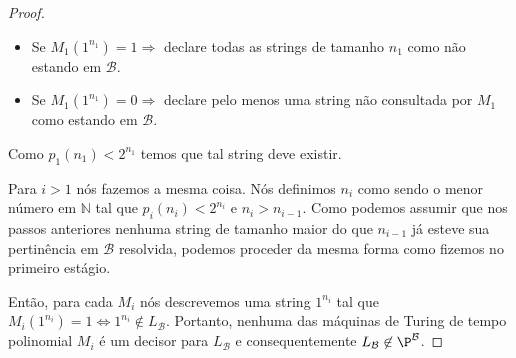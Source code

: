 \begin{proof}
\begin{itemize}
    \item Se $M_{1}(1^{n_{1}}) = 1 \Rightarrow$ declare todas as strings de tamanho $n_{1}$ como não estando em $\mathcal{B}$.
    
    \item Se $M_{1}(1^{n_{1}}) = 0 \Rightarrow$ declare pelo menos uma string não consultada por $M_{1}$ como estando em $\mathcal{B}$.

\end{itemize}

Como $p_{1}(n_{1}) < 2^{n_{1}}$ temos que tal string deve existir.

Para $i > 1$ nós fazemos a mesma coisa. Nós definimos $n_{i}$ como sendo o menor número em $\mathbb{N}$ tal que $p_{i}(n_{i}) < 2^{n_{i}}$ e $n_{i} > n_{i - 1}$. Como podemos assumir que nos passos anteriores nenhuma string de tamanho maior do que $n_{i - 1}$ já esteve sua pertinência em $\mathcal{B}$ resolvida, podemos proceder da mesma forma como fizemos no primeiro estágio.

Então, para cada $M_{i}$ nós descrevemos uma string $1^{n_{i}}$ tal que $M_{i}(1^{n_{i}}) = 1 \iff 1^{n_{i}} \not\in L_{\mathcal{B}}$. Portanto, nenhuma das máquinas de Turing de tempo polinomial $M_{i}$ é um decisor para $L_{\mathcal{B}}$ e consequentemente $L_{\mathcal{B}} \not\in \P^{\mathcal{B}}$.

\end{proof}













